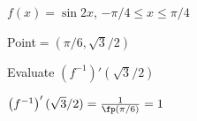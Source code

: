 {$f(x) = \sin 2x$, $-\pi/4\leq x\leq \pi/4$

Point$=(\pi/6,\sqrt{3}/2)$ 

Evaluate $\left(f^{-1}\right)'(\sqrt{3}/2)$}
{$\left(f^{-1}\right)'(\sqrt{3}/2) = \frac{1}{\fp(\pi/6)} = 1$
}
